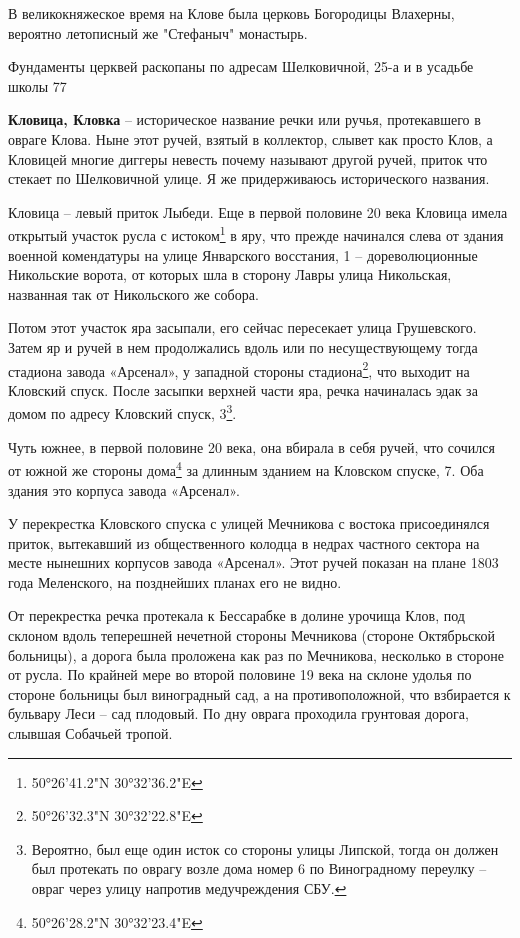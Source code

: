 В великокняжеское время на Клове была церковь Богородицы Влахерны, вероятно летописный же "Стефаныч" монастырь. 

Фундаменты церквей раскопаны по адресам Шелковичной, 25-а и в усадьбе школы 77
\\ 


\medskip


\textbf{Кловица, Кловка} – историческое название речки или ручья, протекавшего в овраге Клова. Ныне этот ручей, взятый в коллектор, слывет как просто Клов, а Кловицей многие диггеры невесть почему называют другой ручей, приток что стекает по Шелковичной улице. Я же придерживаюсь исторического названия.

Кловица – левый приток Лыбеди. Еще в первой половине 20 века Кловица имела открытый участок русла с истоком\footnote{50°26'41.2"N 30°32'36.2"E} в яру, что прежде начинался слева от здания военной комендатуры на улице Январского восстания, 1 – дореволюционные Никольские ворота, от которых шла в сторону Лавры улица Никольская, названная так от Никольского же собора.

Потом этот участок яра засыпали, его сейчас пересекает улица Грушевского. Затем яр и ручей в нем продолжались вдоль или по несуществующему тогда стадиона завода «Арсенал», у западной стороны стадиона\footnote{50°26'32.3"N 30°32'22.8"E}, что выходит на Кловский спуск. После засыпки верхней части яра, речка начиналась эдак за домом по адресу Кловский спуск, 3\footnote{Вероятно, был еще один исток со стороны улицы Липской, тогда он должен был протекать по оврагу возле дома номер 6 по Виноградному переулку – овраг через улицу напротив медучреждения СБУ.}. 

Чуть южнее, в первой половине 20 века, она вбирала в себя ручей, что сочился от южной же стороны дома\footnote{50°26'28.2"N 30°32'23.4"E} за длинным зданием на Кловском спуске, 7. Оба здания это корпуса завода «Арсенал».

У перекрестка Кловского спуска с улицей Мечникова с востока присоединялся приток, вытекавший из общественного колодца в недрах частного сектора на месте нынешних корпусов завода «Арсенал». Этот ручей показан на плане 1803 года Меленского, на позднейших планах его не видно.

От перекрестка речка протекала к Бессарабке в долине урочища Клов, под склоном вдоль теперешней нечетной стороны Мечникова (стороне Октябрьской больницы), а дорога была проложена как раз по Мечникова, несколько в стороне от русла. По крайней мере во второй половине 19 века на склоне удолья по стороне больницы был виноградный сад, а на противоположной, что взбирается к бульвару Леси – сад плодовый. По дну оврага проходила грунтовая дорога, слывшая Собачьей тропой.

